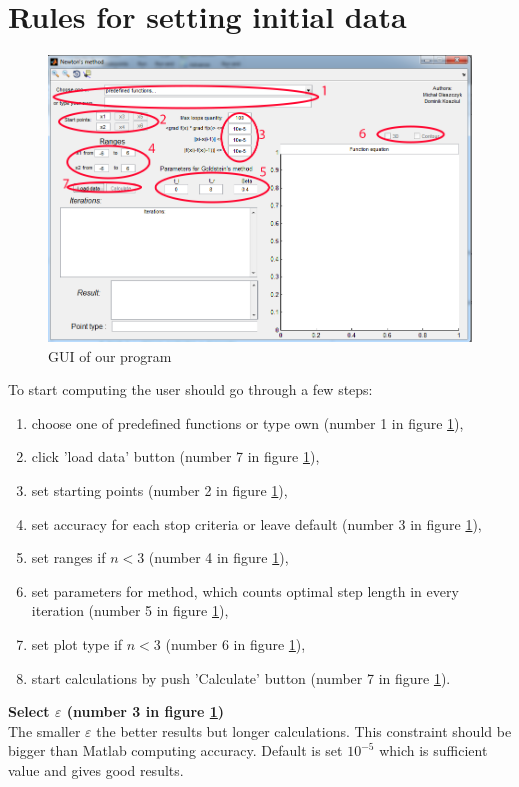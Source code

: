 \documentclass[12pt]{article}
\begin{document}
\section{Rules for setting initial data}
	\begin{figure}[H]
		\begin{center}
			\includegraphics[scale=0.3]{images/program.png}
			\caption{GUI of our program}
		\label{program}
		\end{center}		
	\end{figure}
To start computing the user should go through a few steps:
\begin{enumerate}
\item choose one of predefined functions or type own (number 1 in figure \ref{program}),
\item click 'load data' button (number 7 in figure \ref{program}),
\item set starting points (number 2 in figure \ref{program}),
\item set accuracy for each stop criteria or leave default (number 3 in figure \ref{program}),
\item set ranges if $n < 3$ (number 4 in figure \ref{program}),
\item set parameters for method, which counts optimal step length in every iteration (number 5 in figure \ref{program}),
\item set plot type if $n < 3$ (number 6 in figure \ref{program}),
\item start calculations by push 'Calculate' button (number 7 in figure \ref{program}).
\end{enumerate}
\textbf{Select $\varepsilon$ (number 3 in figure \ref{program})} \\
The smaller $\varepsilon$ the better results but longer calculations. This constraint should be bigger than Matlab computing accuracy. Default is set $10^{-5}$ which is sufficient value and gives good results. \\
\end{document}
